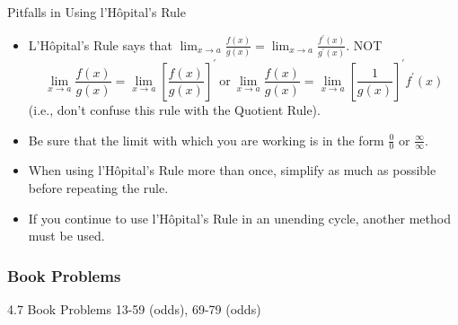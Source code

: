 \documentclass[cal1spr16Lectures.tex]{subfiles}
\begin{document}
\begin{frame}{\small Pitfalls in Using l'H\^{o}pital's Rule}
\footnotesize
\begin{itemize}
\item[1.] L'H\^{o}pital's Rule says that $\displaystyle\lim_{x \to a}\frac{f(x)}{g(x)} = 
\displaystyle\lim_{x \to a}\frac{f^{\prime}(x)}{g^{\prime}(x)}$.  \alert{NOT} 
\[\lim_{x \to a}\frac{f(x)}{g(x)} = \lim_{x \to a}\left[ \frac{f(x)}{g(x)} \right]^{\prime}\ \text{or}\
\lim_{x \to a}\frac{f(x)}{g(x)} = \lim_{x \to a} \left[ \frac{1}{g(x)} \right]^{\prime} f^{\prime}(x)\]
(i.e., don't confuse this rule with the Quotient Rule).
\item[2.] Be sure that the limit with which you are working is in the form $\frac{0}{0}$ or $\frac{\infty}{\infty}$.
\item[3.] When using l'H\^{o}pital's Rule more than once, simplify as much as possible before repeating the rule.
\item[4.] If you continue to use l'H\^{o}pital's Rule in an unending cycle, another method must be used.
\end{itemize}
\end{frame}

\subsubsection{Book Problems}

\begin{frame}
\begin{block}{4.7 Book Problems}
13-59 (odds), 69-79 (odds)
\end{block}
\end{frame}
\end{document}
